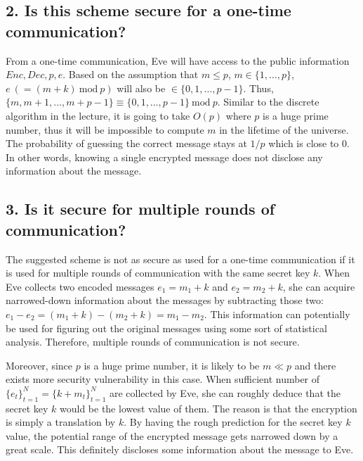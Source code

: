 \documentclass[runningheads]{llncs}
\begin{document}
\subsection*{2. Is this scheme secure for a one-time communication?}
From a one-time communication, Eve will have access to the public information $Enc, Dec, p, e$. 
Based on the assumption that $m \leq p$, $m \in \{1, \dots, p\}$, $e\ (= (m+k)\ \text{mod}\ p)$ will also be $\in \{0, 1, \dots, p-1\}$.
Thus, $\{m, m+1, \dots, m+p-1\} \equiv \{0, 1, \dots, p-1\}\ \text{mod}\ p$.
Similar to the discrete algorithm in the lecture, it is going to take $O(p)$ where $p$ is a huge prime number, thus it will be impossible to compute $m$ in the lifetime of the universe.
The probability of guessing the correct message stays at $1/p$ which is close to 0.
In other words, knowing a single encrypted message does not disclose any information about the message.

\subsection*{3. Is it secure for multiple rounds of communication?}
The suggested scheme is not as secure as used for a one-time communication if it is used for multiple rounds of communication with the same secret key $k$. 
When Eve collects two encoded messages $e_1 = m_1 + k$ and $e_2 = m_2 + k$, she can acquire narrowed-down information about the messages by subtracting those two: $e_1 - e_2 = (m_1 + k) - (m_2 + k) = m_1 - m_2$.
This information can potentially be used for figuring out the original messages using some sort of statistical analysis.
Therefore, multiple rounds of communication is not secure.

Moreover, since $p$ is a huge prime number, it is likely to be $m \ll p$ and there exists more security vulnerability in this case.
When sufficient number of $\{e_t\}_{t=1}^N = \{k+m_t\}_{t=1}^N$ are collected by Eve, she can roughly deduce that the secret key $k$ would be the lowest value of them. 
The reason is that the encryption is simply a translation by $k$. 
By having the rough prediction for the secret key $k$ value, the potential range of the encrypted message gets narrowed down by a great scale.   
This definitely discloses some information about the message to Eve.
\end{document}
